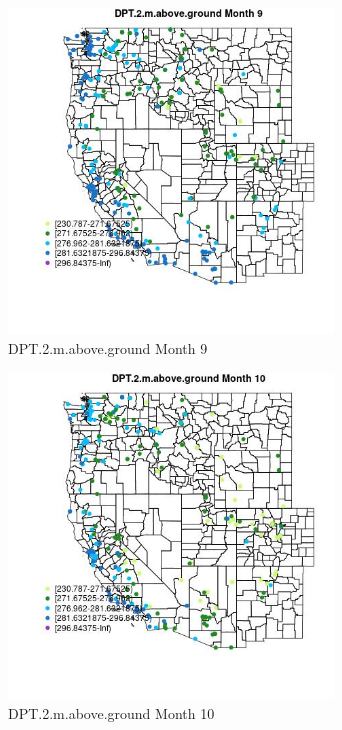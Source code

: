 \begin{figure} 
\centering  
\includegraphics[width=0.77\textwidth]{Code_Outputs/Report_ML_input_PM25_Step4_part_e_de_duplicated_aveswNAs_MapObsMo9DPT2maboveground.jpg} 
\caption{\label{fig:Report_ML_input_PM25_Step4_part_e_de_duplicated_aveswNAsMapObsMo9DPT2maboveground}DPT.2.m.above.ground Month 9} 
\end{figure} 
 

\begin{figure} 
\centering  
\includegraphics[width=0.77\textwidth]{Code_Outputs/Report_ML_input_PM25_Step4_part_e_de_duplicated_aveswNAs_MapObsMo10DPT2maboveground.jpg} 
\caption{\label{fig:Report_ML_input_PM25_Step4_part_e_de_duplicated_aveswNAsMapObsMo10DPT2maboveground}DPT.2.m.above.ground Month 10} 
\end{figure} 
 

